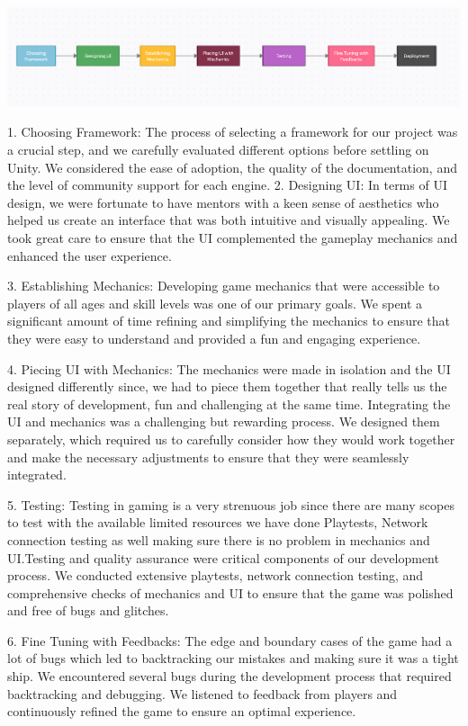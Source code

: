 \documentclass[12pt]{report}
\begin{document}
\begin{center}
   \includegraphics[scale=0.5]{SDLC.png}
\end{center}
\newpage

1.	Choosing Framework: The process of selecting a framework for our project was a crucial step, and we carefully evaluated different options before settling on Unity. We considered the ease of adoption, the quality of the documentation, and the level of community support for each engine.
2.	Designing UI: In terms of UI design, we were fortunate to have mentors with a keen sense of aesthetics who helped us create an interface that was both intuitive and visually appealing. We took great care to ensure that the UI complemented the gameplay mechanics and enhanced the user experience.

3.	Establishing Mechanics: Developing game mechanics that were accessible to players of all ages and skill levels was one of our primary goals. We spent a significant amount of time refining and simplifying the mechanics to ensure that they were easy to understand and provided a fun and engaging experience.

4.	Piecing UI with Mechanics: The mechanics were made in isolation and the UI designed differently since, we had to piece them together that really tells us the real story of development, fun and challenging at the same time. Integrating the UI and mechanics was a challenging but rewarding process. We designed them separately, which required us to carefully consider how they would work together and make the necessary adjustments to ensure that they were seamlessly integrated.

5.	Testing: Testing in gaming is a very strenuous job since there are many scopes to test with the available limited resources we have done Playtests, Network connection testing as well making sure there is no problem in mechanics and UI.Testing and quality assurance were critical components of our development process. We conducted extensive playtests, network connection testing, and comprehensive checks of mechanics and UI to ensure that the game was polished and free of bugs and glitches.

6.	Fine Tuning with Feedbacks: The edge and boundary cases of the game had a lot of bugs which led to backtracking our mistakes and making sure it was a tight ship. We encountered several bugs during the development process that required backtracking and debugging. We listened to feedback from players and continuously refined the game to ensure an optimal experience.
\end{document}

